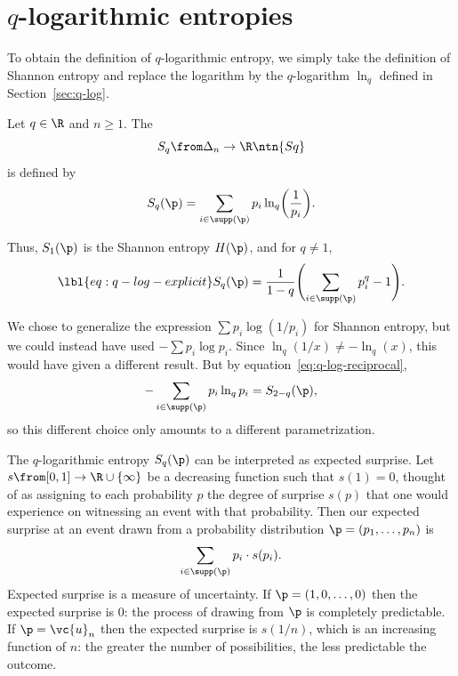 \section{$q$-logarithmic entropies}


To obtain the definition of $q$-logarithmic entropy, we simply take the
definition of Shannon entropy and replace the logarithm by the
$q$-logarithm $\ln_q$ defined in Section~\ref{sec:q-log}.

\begin{defn}
Let $q \in \R$ and $n \geq 1$.  The 
\[
S_q \from \Delta_n \to \R
\ntn{Sq}
\]
is defined by
\[
S_q(\p) 
= 
\sum_{i \in \supp(\p)} p_i \ln_q \biggl( \frac{1}{p_i} \biggr).
\]
\end{defn}

Thus, $S_1(\p)$ is the Shannon entropy $H(\p)$, and for $q \neq 1$,
% 
\begin{equation}
\lbl{eq:q-log-explicit}
S_q(\p)
=
\frac{1}{1 - q} 
\Biggl(
\sum_{i \in \supp(\p)} p_i^q - 1
\Biggr).
\end{equation}

\begin{remark}
We chose to generalize the expression $\sum p_i \log(1/p_i)$ for Shannon
entropy, but we could instead have used $-\sum p_i \log p_i$.  Since
$\ln_q(1/x) \neq -\ln_q(x)$, this would have given a different result.  But
by equation~\eqref{eq:q-log-reciprocal},
\[
-\sum_{i \in \supp(\p)} p_i \ln_q p_i
=
S_{2 - q}(\p),
\]
so this different choice only amounts to a different parametrization.
\end{remark}

The $q$-logarithmic entropy $S_q(\p)$ can be interpreted as expected
surprise. Let $s \from [0, 1] \to \R \cup \{\infty\}$ be a
decreasing function such that $s(1) = 0$, thought of as assigning to each
probability $p$ the degree of surprise $s(p)$ that one would experience on
witnessing an event with that probability.  Then our expected surprise at
an event drawn from a probability distribution $\p = (p_1, \ldots, p_n)$ is
\[
\sum_{i \in \supp(\p)} p_i \cdot s(p_i).
\]
Expected surprise is a measure of uncertainty.  If $\p = (1, 0, \ldots, 0)$
then the expected surprise is $0$: the process of drawing from $\p$ is
completely predictable.  If $\p = \vc{u}_n$ then the expected surprise is
$s(1/n)$, which is an increasing function of $n$: the greater the number of
possibilities, the less predictable the outcome.

